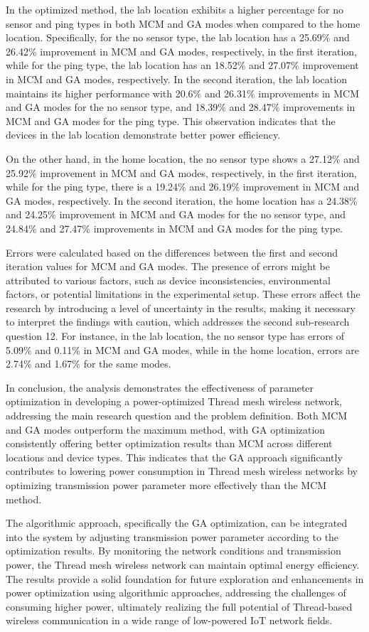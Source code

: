 In the optimized method, the lab location exhibits a higher percentage for no sensor and ping types in both MCM and GA modes when compared to the home location. Specifically, for the no sensor type, the lab location has a 25.69\% and 26.42\% improvement in MCM and GA modes, respectively, in the first iteration, while for the ping type, the lab location has an 18.52\% and 27.07\% improvement in MCM and GA modes, respectively. In the second iteration, the lab location maintains its higher performance with 20.6\% and 26.31\% improvements in MCM and GA modes for the no sensor type, and 18.39\% and 28.47\% improvements in MCM and GA modes for the ping type. This observation indicates that the devices in the lab location demonstrate better power efficiency.

On the other hand, in the home location, the no sensor type shows a 27.12\% and 25.92\% improvement in MCM and GA modes, respectively, in the first iteration, while for the ping type, there is a 19.24\% and 26.19\% improvement in MCM and GA modes, respectively. In the second iteration, the home location has a 24.38\% and 24.25\% improvement in MCM and GA modes for the no sensor type, and 24.84\% and 27.47\% improvements in MCM and GA modes for the ping type.

Errors were calculated based on the differences between the first and second iteration values for MCM and GA modes. The presence of errors might be attributed to various factors, such as device inconsistencies, environmental factors, or potential limitations in the experimental setup. These errors affect the research by introducing a level of uncertainty in the results, making it necessary to interpret the findings with caution, which addresses the second sub-research question 12. For instance, in the lab location, the no sensor type has errors of 5.09\% and 0.11\% in MCM and GA modes, while in the home location, errors are 2.74\% and 1.67\% for the same modes.

In conclusion, the analysis demonstrates the effectiveness of parameter optimization in developing a power-optimized Thread mesh wireless network, addressing the main research question and the problem definition. Both MCM and GA modes outperform the maximum method, with GA optimization consistently offering better optimization results than MCM across different locations and device types. This indicates that the GA approach significantly contributes to lowering power consumption in Thread mesh wireless networks by optimizing transmission power parameter more effectively than the MCM method.

The algorithmic approach, specifically the GA optimization, can be integrated into the system by adjusting transmission power parameter according to the optimization results. By monitoring the network conditions and transmission power, the Thread mesh wireless network can maintain optimal energy efficiency. The results provide a solid foundation for future exploration and enhancements in power optimization using algorithmic approaches, addressing the challenges of consuming higher power, ultimately realizing the full potential of Thread-based wireless communication in a wide range of low-powered IoT network fields.
